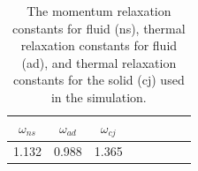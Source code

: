 \begin {table}[ht] %
\caption{The momentum relaxation constants for fluid (ns), thermal relaxation constants for fluid (ad), and thermal relaxation constants for the solid (cj) used in the simulation.}
\label{tab:lbm-relaxations} \centering %
\begin {tabular}{ cccccccc }
\toprule %
$\omega_{ns}$ &  $\omega_{ad}$  &   $\omega_{cj}$     \\\toprule
1.132      &  0.988       &   1.365          \\\bottomrule
\end{tabular}
\end{table}

